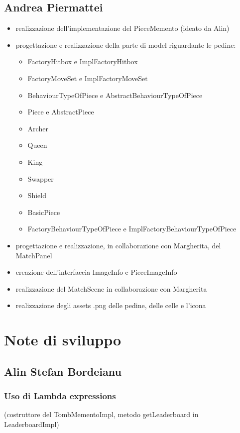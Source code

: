 \documentclass[a4paper,12pt]{report}
\begin{document}
\subsection{Andrea Piermattei}
\begin{itemize}
\item realizzazione dell'implementazione del PieceMemento (ideato da Alin)
\item progettazione e realizzazione della parte di model riguardante le pedine:
\begin{itemize}
\item FactoryHitbox e ImplFactoryHitbox
\item FactoryMoveSet e ImplFactoryMoveSet
\item BehaviourTypeOfPiece e AbstractBehaviourTypeOfPiece
\item Piece e AbstractPiece
\item Archer
\item Queen
\item King
\item Swapper
\item Shield
\item BasicPiece
\item FactoryBehaviourTypeOfPiece e ImplFactoryBehaviourTypeOfPiece
\end{itemize}
\item progettazione e realizzazione, in collaborazione con Margherita, del MatchPanel
\item creazione dell'interfaccia ImageInfo e PieceImageInfo
\item realizzazione del MatchScene in collaborazione con Margherita
\item realizzazione degli assets .png delle pedine, delle celle e l'icona
\end{itemize}


\section{Note di sviluppo}

\subsection{Alin Stefan Bordeianu}

\subsubsection{Uso di Lambda expressions}
(costruttore del TombMementoImpl, metodo getLeaderboard in LeaderboardImpl)
\end{document}
